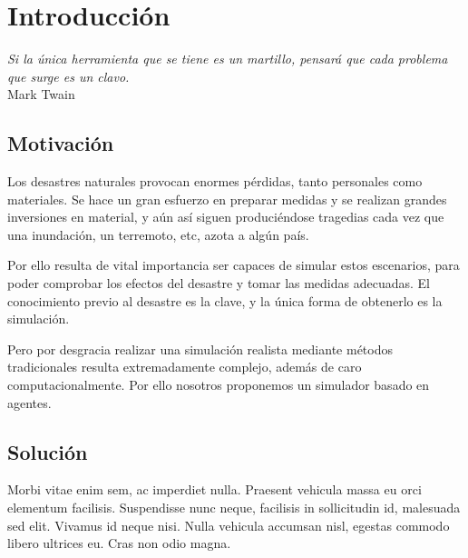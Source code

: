 
\chapter*{Introducción} \label{cap0}


\begin{flushright}
\begin{minipage}{7.85cm}
    {\em Si la única herramienta que se tiene es un martillo, pensará que cada
    problema que surge es un clavo.} \\  Mark Twain
\end{minipage}
\end{flushright}

\vspace*{5mm}

\section*{Motivación}

Los desastres naturales provocan enormes pérdidas, tanto personales como
materiales. Se hace un gran esfuerzo en preparar medidas y se realizan grandes
inversiones en material, y aún así siguen produciéndose tragedias cada vez que
una inundación, un terremoto, etc, azota a algún país.

Por ello resulta de vital importancia ser capaces de simular estos escenarios,
para poder comprobar los efectos del desastre y tomar las medidas adecuadas. El
conocimiento previo al desastre es la clave, y la única forma de obtenerlo es
la simulación.

Pero por desgracia realizar una simulación realista mediante métodos
tradicionales resulta extremadamente complejo, además de caro
computacionalmente. Por ello nosotros proponemos un simulador basado en agentes.

\section*{Solución}

Morbi vitae enim sem, ac imperdiet nulla. Praesent vehicula massa eu orci
elementum facilisis. Suspendisse nunc neque, facilisis in sollicitudin id,
malesuada sed elit. Vivamus id neque nisi. Nulla vehicula accumsan nisl, egestas
commodo libero ultrices eu. Cras non odio magna.

